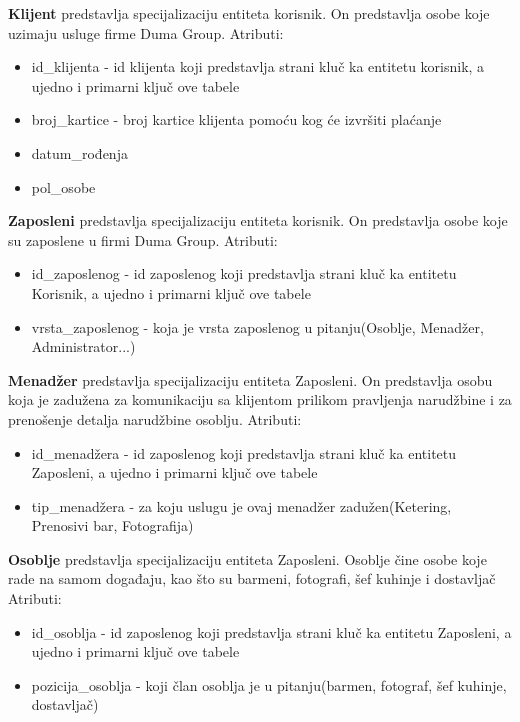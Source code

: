 \documentclass[a4paper]{article}
\begin{document}
\vspace{3mm}

\textbf{Klijent} predstavlja specijalizaciju entiteta korisnik. On predstavlja osobe koje uzimaju usluge firme Duma Group. Atributi:
\begin{itemize}
    \item id\_klijenta - id klijenta koji predstavlja strani kluč ka entitetu korisnik, a ujedno i primarni ključ ove tabele
    \item broj\_kartice - broj kartice klijenta pomoću kog će izvršiti plaćanje
    \item datum\_rođenja
    \item pol\_osobe
\end{itemize}

\vspace{3mm}

\textbf{Zaposleni} predstavlja specijalizaciju entiteta korisnik. On predstavlja osobe koje su zaposlene u firmi Duma Group. Atributi:
\begin{itemize}
    \item id\_zaposlenog - id zaposlenog koji predstavlja strani kluč ka entitetu Korisnik, a ujedno i primarni ključ ove tabele
    \item vrsta\_zaposlenog - koja je vrsta zaposlenog u pitanju(Osoblje, Menadžer, Administrator...)
\end{itemize}

\vspace{3mm}

\textbf{Menadžer} predstavlja specijalizaciju entiteta Zaposleni. On predstavlja osobu koja je zadužena za komunikaciju sa klijentom prilikom pravljenja narudžbine i za prenošenje detalja narudžbine osoblju. Atributi:
\begin{itemize}
    \item id\_menadžera - id zaposlenog koji predstavlja strani kluč ka entitetu Zaposleni, a ujedno i primarni ključ ove tabele
    \item tip\_menadžera - za koju uslugu je ovaj menadžer zadužen(Ketering, Prenosivi bar, Fotografija) 
\end{itemize}

\vspace{3mm}

\textbf{Osoblje} predstavlja specijalizaciju entiteta Zaposleni. Osoblje čine osobe koje rade na samom događaju, kao što su barmeni, fotografi, šef kuhinje i dostavljač Atributi:
\begin{itemize}
    \item id\_osoblja - id zaposlenog koji predstavlja strani kluč ka entitetu Zaposleni, a ujedno i primarni ključ ove tabele
    \item pozicija\_osoblja - koji član osoblja je u pitanju(barmen, fotograf, šef kuhinje, dostavljač) 
\end{itemize}
\end{document}
